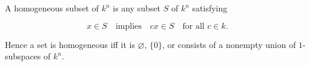 A homogeneous subset of $k^n$ is any subset $S$ of $k^n$ satisfying

$$x \in S \quad \text{implies} \quad cx \in S \quad \text{for all } c \in k.$$

Hence a set is homogeneous iff it is $\varnothing$, $\{0\}$, or consists of a nonempty union of $1$-subspaces of $k^n$.
